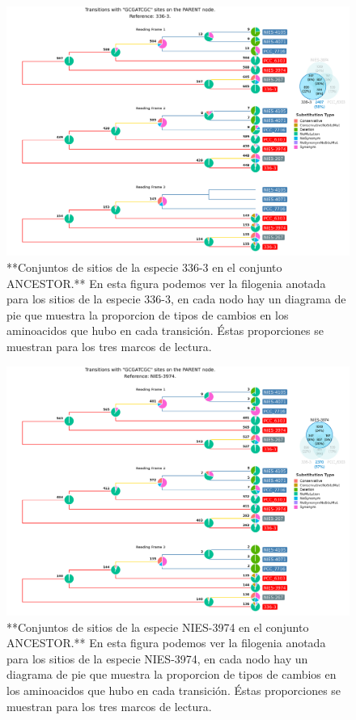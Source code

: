 \documentclass[
]{book}
\begin{document}
\begin{figure}

{\centering \includegraphics[width=1.2\linewidth]{Clados/Calothrix_B/figures/A/GCGATCGC/Ancestor/336-3_Ancestor_A_tree} 

}

\caption{**Conjuntos de sitios de la especie 336-3 en el conjunto ANCESTOR.** En esta figura podemos ver la filogenia anotada para los sitios de la especie 336-3, en cada nodo hay un diagrama de pie que muestra la proporcion de tipos de cambios en los aminoacidos que hubo en cada transición. Éstas proporciones se muestran para los tres marcos de lectura.}\label{fig:FIG5x}
\end{figure}

\begin{figure}

{\centering \includegraphics[width=1.2\linewidth]{Clados/Calothrix_B/figures/A/GCGATCGC/Ancestor/NIES-3974_Ancestor_A_tree} 

}

\caption{**Conjuntos de sitios de la especie NIES-3974 en el conjunto ANCESTOR.** En esta figura podemos ver la filogenia anotada para los sitios de la especie NIES-3974, en cada nodo hay un diagrama de pie que muestra la proporcion de tipos de cambios en los aminoacidos que hubo en cada transición. Éstas proporciones se muestran para los tres marcos de lectura.}\label{fig:FIG6x}
\end{figure}
\end{document}
